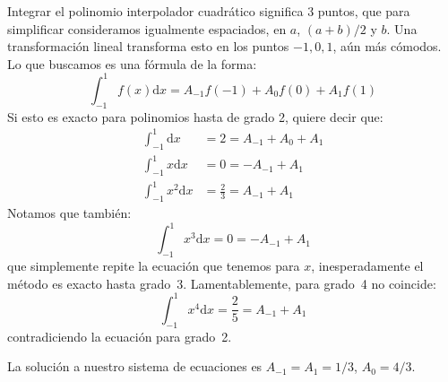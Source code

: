   Integrar el polinomio interpolador cuadrático significa \num{3} puntos,
  que para simplificar consideramos igualmente espaciados,
  en \(a\), \((a + b) / 2\) y \(b\).
  Una transformación lineal transforma esto en los puntos \(-1, 0, 1\),
  aún más cómodos.
  Lo que buscamos es una fórmula de la forma:
  \begin{equation*}
    \int_{-1}^1 f(x) \mathrm{d} x
      = A_{-1} f(-1) + A_0 f(0) + A_1 f(1)
  \end{equation*}
  Si esto es exacto para polinomios hasta de grado \num{2},
  quiere decir que:
  \begin{align*}
    \int_{-1}^1 \mathrm{d} x
      &= 2
       = A_{-1} + A_0 + A_1 \\
    \int_{-1}^1 x \mathrm{d} x
      &= 0
       = - A_{-1} + A_1 \\
    \int_{-1}^1 x^2 \mathrm{d} x
      &= \frac{2}{3}
       = A_{-1} + A_1
  \end{align*}
  Notamos que también:
  \begin{equation*}
    \int_{-1}^1 x^3 \mathrm{d} x
      = 0
      = - A_{-1} + A_1
  \end{equation*}
  que simplemente repite la ecuación que tenemos para \(x\),
  inesperadamente el método es exacto hasta grado~\num{3}.
  Lamentablemente,
  para grado~\num{4} no coincide:
  \begin{equation*}
    \int_{-1}^1 x^4 \mathrm{d} x
      = \frac{2}{5}
      = A_{-1} + A_1
  \end{equation*}
  contradiciendo la ecuación para grado~\num{2}.

  La solución a nuestro sistema de ecuaciones es
  \(A_{-1} = A_1 = 1/3\), \(A_0 = 4/3\).

